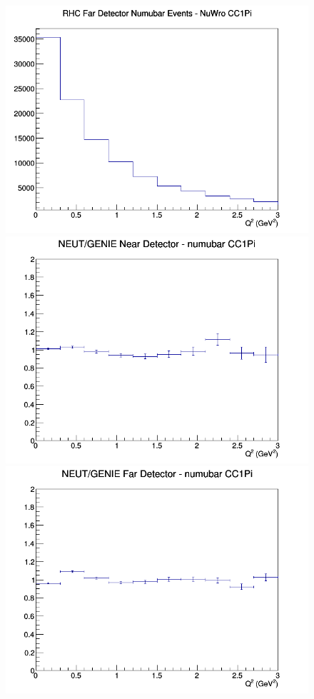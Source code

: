 \documentclass[12pt]{article}
\begin{document}
\begin{figure}[h]
\endminipage
{}
\includegraphics[width=\linewidth]{eff_Q2/FGT/CC1Pi_RHC_FD_numubar_Q2_NuWro.png}
\endminipage
\newline
{}
\includegraphics[width=\linewidth]{eff_Q2/FGT/ratios/CC1Pi_NEUT_GENIE_numubar_near_Q2.png}
\endminipage
{}
\includegraphics[width=\linewidth]{eff_Q2/FGT/ratios/CC1Pi_NEUT_GENIE_numubar_far_Q2.png}

\end{figure}
\end{document}
